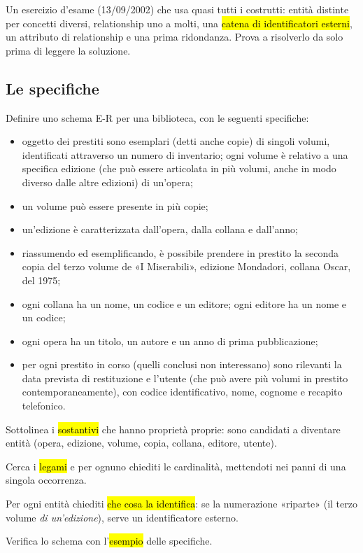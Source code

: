 
\begin{inbreve}
Un esercizio d'esame (13/09/2002) che usa quasi tutti i costrutti: entità distinte per concetti diversi, relationship uno a molti, una \hl{catena di identificatori esterni}, un attributo di relationship e una prima ridondanza. Prova a risolverlo da solo prima di leggere la soluzione.
\end{inbreve}

\subsection{Le specifiche}

\begin{tecnica}
Definire uno schema E-R per una biblioteca, con le seguenti specifiche:
\begin{itemize}
  \item oggetto dei prestiti sono esemplari (detti anche copie) di singoli volumi, identificati attraverso un numero di inventario; ogni volume è relativo a una specifica edizione (che può essere articolata in più volumi, anche in modo diverso dalle altre edizioni) di un'opera;
  \item un volume può essere presente in più copie;
  \item un'edizione è caratterizzata dall'opera, dalla collana e dall'anno;
  \item riassumendo ed esemplificando, è possibile prendere in prestito la seconda copia del terzo volume de «I Miserabili», edizione Mondadori, collana Oscar, del 1975;
  \item ogni collana ha un nome, un codice e un editore; ogni editore ha un nome e un codice;
  \item ogni opera ha un titolo, un autore e un anno di prima pubblicazione;
  \item per ogni prestito in corso (quelli conclusi non interessano) sono rilevanti la data prevista di restituzione e l'utente (che può avere più volumi in prestito contemporaneamente), con codice identificativo, nome, cognome e recapito telefonico.
\end{itemize}
\end{tecnica}

\begin{consiglio}
\begin{passi}
  \item Sottolinea i \hl{sostantivi} che hanno proprietà proprie: sono candidati a diventare entità (opera, edizione, volume, copia, collana, editore, utente).
  \item Cerca i \hl{legami} e per ognuno chiediti le cardinalità, mettendoti nei panni di una singola occorrenza.
  \item Per ogni entità chiediti \hl{che cosa la identifica}: se la numerazione «riparte» (il terzo volume \emph{di un'edizione}), serve un identificatore esterno.
  \item Verifica lo schema con l'\hl{esempio} delle specifiche.
\end{passi}
\end{consiglio}

